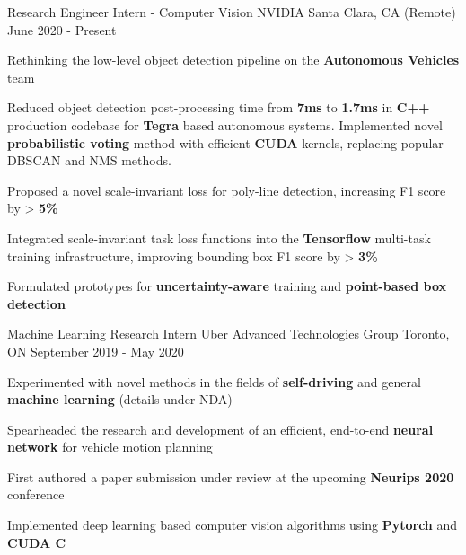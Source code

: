 
\begin{cventries}
  \cventry
    {Research Engineer Intern - Computer Vision} %
    {NVIDIA} %
    {Santa Clara, CA (Remote)} %
    {June 2020 - Present} %
    {
      \begin{cvitems} %
        \item {Rethinking the low-level object detection pipeline on the \textbf{Autonomous Vehicles} team}
        \item {Reduced object detection post-processing time from \textbf{7ms} to \textbf{1.7ms} in \textbf{C++} production codebase for \textbf{Tegra} based autonomous systems. Implemented novel \textbf{probabilistic voting} method with efficient \textbf{CUDA} kernels, replacing popular DBSCAN and NMS methods.}
        \item {Proposed a novel scale-invariant loss for poly-line detection, increasing F1 score by > \textbf{5\%}}
        \item {Integrated scale-invariant task loss functions into the \textbf{Tensorflow} multi-task training infrastructure, improving bounding box F1 score by > \textbf{3\%}}
        \item {Formulated prototypes for \textbf{uncertainty-aware} training and \textbf{point-based box detection}}
      \end{cvitems}
    }

  \cventry
    {Machine Learning Research Intern} %
    {Uber Advanced Technologies Group} %
    {Toronto, ON} %
    {September 2019 - May 2020} %
    {
      \begin{cvitems} %
        \item {Experimented with novel methods in the fields of \textbf{self-driving} and general \textbf{machine learning} (details under NDA)}
        \item {Spearheaded the research and development of an efficient, end-to-end \textbf{neural network} for vehicle motion planning}
        \item {First authored a paper submission under review at the upcoming \textbf{Neurips 2020} conference}
        \item {Implemented deep learning based computer vision algorithms using \textbf{Pytorch} and \textbf{CUDA C}}
      \end{cvitems}
    }


\end{cventries}
